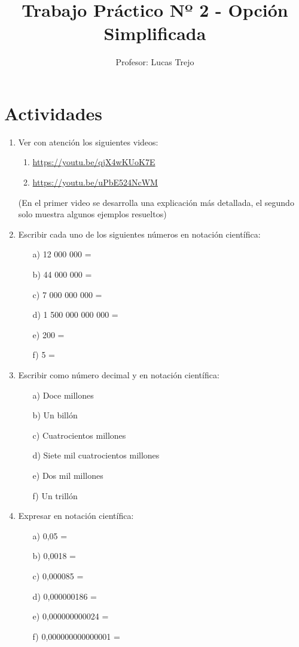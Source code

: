 \documentclass{article}
\title{Trabajo Práctico Nº 2 - Opción Simplificada}
\author{Profesor: Lucas Trejo}
\date{}
\begin{document}
\maketitle

\section*{Actividades}

\begin{enumerate}
    \item Ver con atención los siguientes videos:
    \begin{enumerate}
        \item \url{https://youtu.be/qjX4wKUoK7E}
        \item \url{https://youtu.be/uPbE524NcWM}
    \end{enumerate}
    (En el primer video se desarrolla una explicación más detallada, el segundo solo muestra algunos ejemplos resueltos)

    \item Escribir cada uno de los siguientes números en notación científica:
    \begin{itemize}
        \item[a)] 12 000 000 = 
        \item[b)] 44 000 000 = 
        \item[c)] 7 000 000 000 = 
        \item[d)] 1 500 000 000 000 = 
        \item[e)] 200 = 
        \item[f)] 5 = 
    \end{itemize}

    \item Escribir como número decimal y en notación científica:
    \begin{itemize}
        \item[a)] Doce millones 
        \item[b)] Un billón 
        \item[c)] Cuatrocientos millones 
        \item[d)] Siete mil cuatrocientos millones
        \item[e)] Dos mil millones 
        \item[f)] Un trillón 
    \end{itemize}

    \item Expresar en notación científica:
    \begin{itemize}
        \item[a)] 0,05 = 
        \item[b)] 0,0018 = 
        \item[c)] 0,000085 = 
        \item[d)] 0,000000186 = 
        \item[e)] 0,000000000024 = 
        \item[f)] 0,000000000000001 = 
    \end{itemize}


\end{enumerate}
\end{document}
